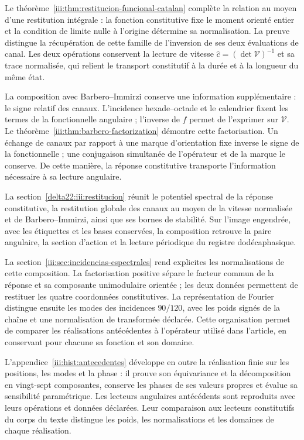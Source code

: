 Le théorème~\ref{iii:thm:restitucion-funcional-catalan} complète la
relation au moyen d’une restitution intégrale : la fonction constitutive
fixe le moment orienté entier et la condition de limite nulle à
l’origine détermine sa normalisation. La preuve distingue la récupération
de cette famille de l’inversion de ses deux évaluations de canal.
Les deux opérations conservent la lecture de vitesse
$\widehat c=(\det\mathcal V)^{-1}$ et sa trace normalisée, qui relient
le transport constitutif à la durée et à la longueur du même état.

La composition avec Barbero--Immirzi conserve une information supplémentaire :
le signe relatif des canaux. L’incidence hexade--octade et le
calendrier fixent les termes de la fonctionnelle angulaire ; l’inverse de
$f$ permet de l’exprimer sur $\mathcal V$. Le
théorème~\ref{iii:thm:barbero-factorization} démontre cette
factorisation. Un échange de canaux par rapport à une marque
d’orientation fixe inverse le signe de la fonctionnelle ; une conjugaison
simultanée de l’opérateur et de la marque le conserve. De cette manière, la réponse
constitutive transporte l’information nécessaire à sa lecture angulaire.

\par
La section~\ref{delta22:iii:restitucion} réunit le potentiel spectral de la réponse constitutive, la restitution globale des canaux au moyen de la vitesse normalisée et de Barbero--Immirzi, ainsi que ses bornes de stabilité. Sur l’image engendrée, avec les étiquettes et les bases conservées, la composition retrouve la paire angulaire, la section d’action et la lecture périodique du registre dodécaphasique.

La section~\ref{iii:sec:incidencias-espectrales} rend explicites les
normalisations de cette composition. La factorisation positive sépare
le facteur commun de la réponse et sa composante unimodulaire orientée ;
les deux données permettent de restituer les quatre coordonnées constitutives.
La représentation de Fourier distingue ensuite les modes des
incidences $90/120$, avec les poids signés de la chaîne et une
normalisation de transformée déclarée. Cette organisation permet de
comparer les réalisations antécédentes à l’opérateur utilisé
dans l’article, en conservant pour chacune sa fonction et son domaine.

L’appendice~\ref{iii:hist:antecedentes} développe en outre la réalisation
finie sur les positions, les modes et la phase : il prouve son équivariance et la
décomposition en vingt-sept composantes, conserve les phases de ses
valeurs propres et évalue sa sensibilité paramétrique. Les lecteurs angulaires
antécédents sont reproduits avec leurs opérations et données déclarées.
Leur comparaison aux lecteurs constitutifs du corps du texte distingue les
poids, les normalisations et les domaines de chaque réalisation.

